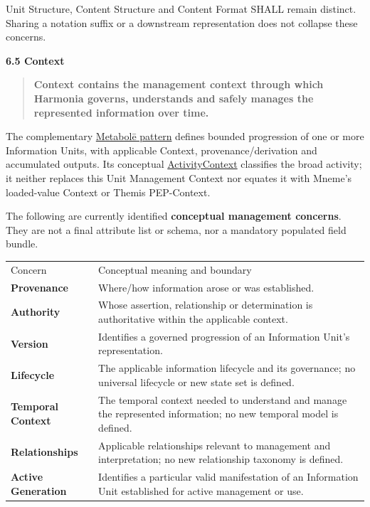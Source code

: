 Unit Structure, Content Structure and Content Format SHALL remain distinct.
Sharing a notation suffix or a downstream representation does not collapse
these concerns.



\par\medskip\textbf{6.5 Context}\par


\begin{quote}


\textbf{Context contains the management context through which Harmonia governs, understands and safely manages the represented information over time.}



\end{quote}


The complementary \href{\detokenize{../../../../../docs/markdown/04-information-architecture/patterns/metabole.md}}{Metabolē pattern} defines bounded
progression of one or more Information Units, with applicable Context,
provenance/derivation and accumulated outputs. Its conceptual
\hyperref[element:c34b4929f71946708d37dbe6c1da920a]{ActivityContext}
classifies the broad activity; it neither replaces this Unit Management Context
nor equates it with Mneme's loaded-value Context or Themis PEP-Context.



The following are currently identified \textbf{conceptual management concerns}. They
are not a final attribute list or schema, nor a mandatory populated field bundle.



\begin{longtable}{>{\raggedright\arraybackslash}p{}>{\raggedright\arraybackslash}p{}}
Concern & Conceptual meaning and boundary \\
\textbf{Provenance} & Where/how information arose or was established. \\
\textbf{Authority} & Whose assertion, relationship or determination is authoritative within the applicable context. \\
\textbf{Version} & Identifies a governed progression of an Information Unit's representation. \\
\textbf{Lifecycle} & The applicable information lifecycle and its governance; no universal lifecycle or new state set is defined. \\
\textbf{Temporal Context} & The temporal context needed to understand and manage the represented information; no new temporal model is defined. \\
\textbf{Relationships} & Applicable relationships relevant to management and interpretation; no new relationship taxonomy is defined. \\
\textbf{Active Generation} & Identifies a particular valid manifestation of an Information Unit established for active management or use. \\
\end{longtable}


